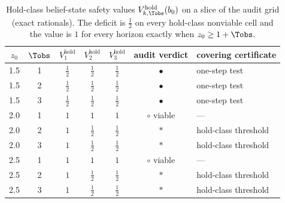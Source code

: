 \begin{table}[htbp]
\centering\small
\begin{tabular}{@{}ccccccl@{}}
\toprule
$z_0$ & $\Tobs$ & $V^{\mathrm{hold}}_1$ & $V^{\mathrm{hold}}_2$ & $V^{\mathrm{hold}}_3$ & audit verdict & covering certificate\\
\midrule
1.5 & 1 & $\tfrac12$ & $\tfrac12$ & $\tfrac12$ & $\bullet$ & one-step test\\
1.5 & 2 & $\tfrac12$ & $\tfrac12$ & $\tfrac12$ & $\bullet$ & one-step test\\
1.5 & 3 & $\tfrac12$ & $\tfrac12$ & $\tfrac12$ & $\bullet$ & one-step test\\
2.0 & 1 & $1$ & $1$ & $1$ & $\circ$ viable & ---\\
2.0 & 2 & $1$ & $\tfrac12$ & $\tfrac12$ & $\ast$ & hold-class threshold\\
2.0 & 3 & $1$ & $\tfrac12$ & $\tfrac12$ & $\ast$ & hold-class threshold\\
2.5 & 1 & $1$ & $1$ & $1$ & $\circ$ viable & ---\\
2.5 & 2 & $1$ & $\tfrac12$ & $\tfrac12$ & $\ast$ & hold-class threshold\\
2.5 & 3 & $1$ & $\tfrac12$ & $\tfrac12$ & $\ast$ & hold-class threshold\\
\bottomrule
\end{tabular}
\caption{Hold-class belief-state safety values $V^{\mathrm{hold}}_{k,\Tobs}(b_0)$ on a slice of the audit grid (exact rationals). The deficit is $\tfrac12$ on every hold-class nonviable cell and the value is $1$ for every horizon exactly when $z_0\ge1+\Tobs$.}
\label{tab:beliefV}
\end{table}
